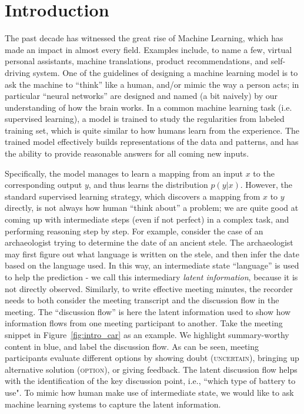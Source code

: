 \chapter{Introduction} \label{sec:ch-1}

The past decade has witnessed the great rise of Machine Learning, which has made an impact in almost every field. Examples include, to name a few, virtual personal assistants, machine translations, product recommendations, and self-driving system. One of the guidelines of designing a machine learning model is to ask the machine to ``think'' like a human, and/or mimic the way a person acts; in particular ``neural networks'' are designed and named (a bit naively) by our understanding of how the brain works. In a common machine learning task (i.e. supervised learning), a model is trained to study the regularities from labeled training set, which is quite similar to how humans learn from the experience. The trained model effectively builds representations of the data and patterns, and has the ability to provide reasonable answers for all coming new inputs. 

Specifically, the model manages to learn a mapping from an input $x$ to the corresponding output $y$, and thus learns the distribution $p(y|x)$. However, the standard supervised learning strategy, which discovers a mapping from $x$ to $y$ directly, is not always how human ``think about'' a problem; we are quite good at coming up with intermediate steps (even if not perfect) in a complex task, and performing reasoning step by step. For example, consider the case of an archaeologist trying to determine the date of an ancient stele. The archaeologist may first figure out what language is written on the stele, and then infer the date based on the language used. In this way, an intermediate state ``language'' is used to help the prediction - we call this intermediary \emph{latent information}, because it is not directly observed. Similarly, to write effective meeting minutes, the recorder needs to both consider the meeting transcript and the discussion flow in the meeting. The ``discussion flow'' is here the latent information used to show how information flows from one meeting participant to another. Take the meeting snippet in Figure~\ref{fig:intro_car} as an example. We highlight summary-worthy content in blue, and label the discussion flow. As can be seen, meeting participants evaluate different options by showing doubt (\textsc{uncertain}), bringing up alternative solution (\textsc{option}), or giving feedback. The latent discussion flow helps with the identification of the key discussion point, i.e., ``which type of battery to use". To mimic how human make use of intermediate state, we would like to ask machine learning systems to capture the latent information.

